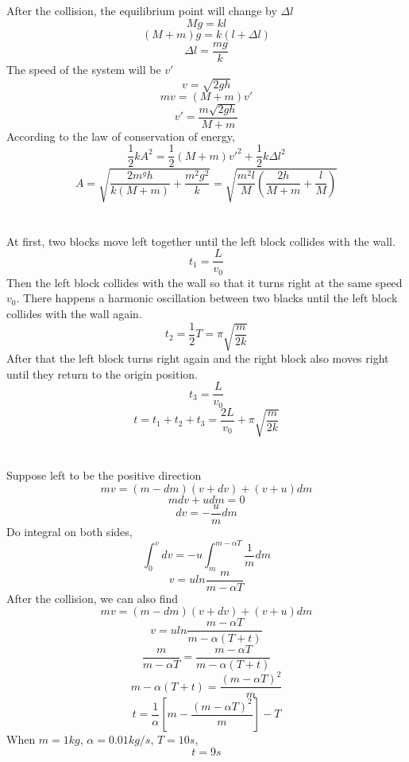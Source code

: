 \documentclass{article}
\begin{document}
\section{}
	After the collision, the equilibrium point will change by $\Delta l$
	$$Mg=kl$$
	$$(M+m)g=k(l+\Delta l)$$
	$$\Delta l=\frac{mg}{k}$$
	The speed of the system will be $v'$
	$$v=\sqrt{2gh}$$
	$$mv=(M+m)v'$$
	$$v'=\frac{m\sqrt{2gh}}{M+m}$$
	According to the law of conservation of energy,
	$$\frac{1}{2}kA^2=\frac{1}{2}(M+m)v'^2+\frac{1}{2}k\Delta l^2$$
	$$A=\sqrt{\frac{2m^gh}{k(M+m)}+\frac{m^2g^2}{k}}=\sqrt{\frac{m^2l}{M}\left(\frac{2h}{M+m}+\frac{l}{M}\right)}$$
	
\section{}
	At first, two blocks move left together until the left block collides with the wall.
	$$t_1=\frac{L}{v_0}$$
	Then the left block collides with the wall so that it turns right at the same speed $v_0$. There happens a harmonic oscillation between two blacks until the left block collides with the wall again.
	$$t_2=\frac{1}{2}T=\pi\sqrt{\frac{m}{2k}}$$
	After that the left block turns right again and the right block also moves right until they return to the origin position.
	$$t_3=\frac{L}{v_0}$$
	$$t=t_1+t_2+t_3=\frac{2L}{v_0}+\pi\sqrt{\frac{m}{2k}}$$
	
\section{}
	Suppose left to be the positive direction
	$$mv=(m-dm)(v+dv)+(v+u)dm$$
	$$mdv+udm=0$$
	$$dv=-\frac{u}{m}dm$$
	Do integral on both sides,
	$$\int_0^vdv=-u\int_m^{m-\alpha T}\frac{1}{m}dm$$
	$$v=uln\frac{m}{m-\alpha T}$$
	After the collision, we can also find
	$$mv=(m-dm)(v+dv)+(v+u)dm$$
	$$v=uln\frac{m-\alpha T}{m-\alpha (T+t)}$$
	$$\frac{m}{m-\alpha T}=\frac{m-\alpha T}{m-\alpha (T+t)}$$
	$$m-\alpha (T+t)=\frac{(m-\alpha T)^2}{m}$$
	$$t=\frac{1}{\alpha}\left[m-\frac{(m-\alpha T)^2}{m}\right]-T$$
	When $m=1kg$, $\alpha=0.01kg/s$, $T=10s$,
	$$t=9s$$
\end{document}
